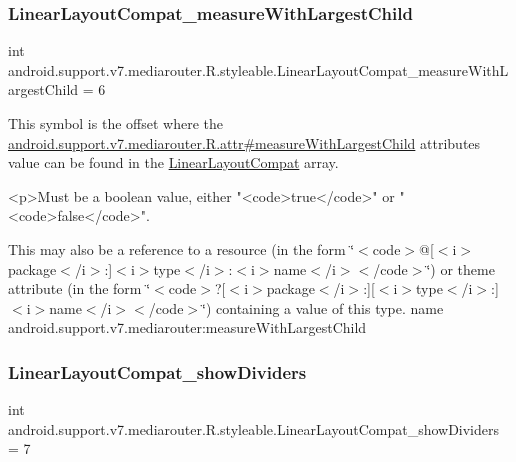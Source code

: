 \subsubsection{\texorpdfstring{Linear\+Layout\+Compat\+\_\+measure\+With\+Largest\+Child}{LinearLayoutCompat\_measureWithLargestChild}}
{\footnotesize\ttfamily int android.\+support.\+v7.\+mediarouter.\+R.\+styleable.\+Linear\+Layout\+Compat\+\_\+measure\+With\+Largest\+Child = 6\hspace{0.3cm}{\ttfamily [static]}}

This symbol is the offset where the \hyperlink{classandroid_1_1support_1_1v7_1_1mediarouter_1_1R_1_1attr_a899ba0652d7456262ca0278dcd856b28}{android.\+support.\+v7.\+mediarouter.\+R.\+attr\#measure\+With\+Largest\+Child} attribute\textquotesingle{}s value can be found in the \hyperlink{classandroid_1_1support_1_1v7_1_1mediarouter_1_1R_1_1styleable_a47eee9f8c488407b3ea7145bb65c01b9}{Linear\+Layout\+Compat} array.

\begin{DoxyVerb}      <p>Must be a boolean value, either "<code>true</code>" or "<code>false</code>".
\end{DoxyVerb}
 

This may also be a reference to a resource (in the form \char`\"{}$<$code$>$@\mbox{[}$<$i$>$package$<$/i$>$\+:\mbox{]}$<$i$>$type$<$/i$>$\+:$<$i$>$name$<$/i$>$$<$/code$>$\char`\"{}) or theme attribute (in the form \char`\"{}$<$code$>$?\mbox{[}$<$i$>$package$<$/i$>$\+:\mbox{]}\mbox{[}$<$i$>$type$<$/i$>$\+:\mbox{]}$<$i$>$name$<$/i$>$$<$/code$>$\char`\"{}) containing a value of this type.  name android.\+support.\+v7.\+mediarouter\+:measure\+With\+Largest\+Child \mbox{\label{classandroid_1_1support_1_1v7_1_1mediarouter_1_1R_1_1styleable_a54ae018341bb332d05e8be7723f49be8}} 
\subsubsection{\texorpdfstring{Linear\+Layout\+Compat\+\_\+show\+Dividers}{LinearLayoutCompat\_showDividers}}
{\footnotesize\ttfamily int android.\+support.\+v7.\+mediarouter.\+R.\+styleable.\+Linear\+Layout\+Compat\+\_\+show\+Dividers = 7\hspace{0.3cm}{\ttfamily [static]}}


